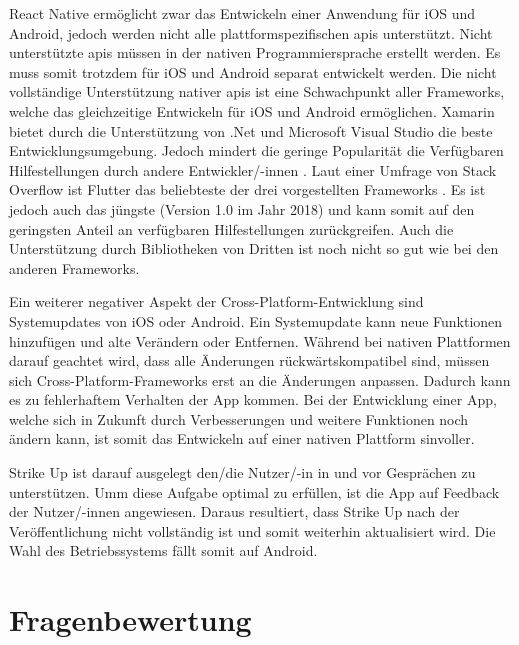 React Native ermöglicht zwar das Entwickeln einer Anwendung für iOS und Android, jedoch werden nicht alle plattformspezifischen \glspl{api} unterstützt. Nicht unterstützte \glspl{api} müssen in der nativen Programmiersprache erstellt werden. Es muss somit trotzdem für iOS und Android separat entwickelt werden. \cite{misc:reactnative_vs_native}\newline
Die nicht vollständige Unterstützung nativer \glspl{api} ist eine Schwachpunkt aller Frameworks, welche das gleichzeitige Entwickeln für iOS und Android ermöglichen. \newline
Xamarin bietet durch die Unterstützung von .Net und Microsoft Visual Studio die beste Entwicklungsumgebung. Jedoch mindert die geringe Popularität die Verfügbaren Hilfestellungen durch andere Entwickler/-innen \cite{misc:flutter_reactnative_xamarin}. \newline
Laut einer Umfrage von Stack Overflow ist Flutter das beliebteste der drei vorgestellten Frameworks \cite{misc:so_popularity}. Es ist jedoch auch das jüngste (Version 1.0 im Jahr 2018) und kann somit auf den geringsten Anteil an verfügbaren Hilfestellungen zurückgreifen. Auch die Unterstützung durch Bibliotheken von Dritten ist noch nicht so gut wie bei den anderen Frameworks.
\cite{misc:flutter_reactnative_xamarin}

Ein weiterer negativer Aspekt der Cross-Platform-Entwicklung sind Systemupdates von iOS oder Android. Ein Systemupdate kann neue Funktionen hinzufügen und alte Verändern oder Entfernen. Während bei nativen Plattformen darauf geachtet wird, dass alle Änderungen rückwärtskompatibel sind, müssen sich Cross-Platform-Frameworks erst an die Änderungen anpassen. Dadurch kann es zu fehlerhaftem Verhalten der App kommen. Bei der Entwicklung einer App, welche sich in Zukunft durch Verbesserungen und weitere Funktionen noch ändern kann, ist somit das Entwickeln auf einer nativen Plattform sinvoller.

Strike Up ist darauf ausgelegt den/die Nutzer/-in in und vor Gesprächen zu unterstützen. Umm diese Aufgabe optimal zu erfüllen, ist die App auf Feedback der Nutzer/-innen angewiesen. Daraus resultiert, dass Strike Up nach der Veröffentlichung nicht vollständig ist und somit weiterhin aktualisiert wird. \newline
Die Wahl des Betriebssystems fällt somit auf Android.

\section{Fragenbewertung}
\label{sec:bewertung_fragenbewertung}

